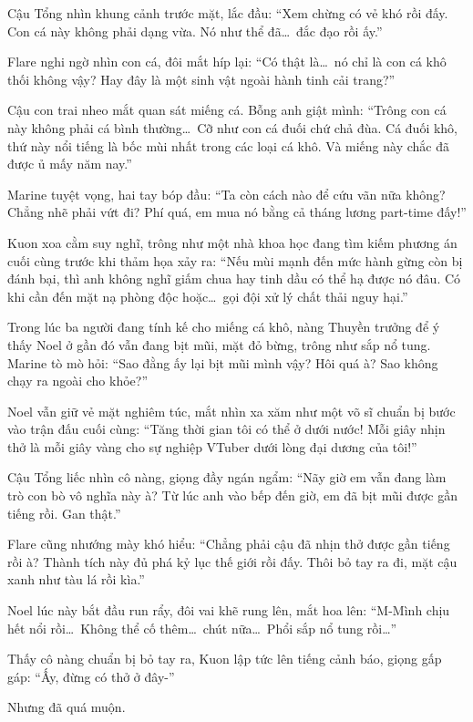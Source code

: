 \documentclass[../main.tex]{subfiles}
\begin{document}
Cậu Tổng nhìn khung cảnh trước mặt, lắc đầu: ``Xem chừng có vẻ khó rồi đấy. Con cá này không phải dạng vừa. Nó như thể đã\dots\ đắc đạo rồi ấy.''

Flare nghi ngờ nhìn con cá, đôi mắt híp lại: ``Có thật là\dots\ nó chỉ là con cá khô thối không vậy? Hay đây là một sinh vật ngoài hành tinh cải trang?''

Cậu con trai nheo mắt quan sát miếng cá. Bỗng anh giật mình: ``Trông con cá này không phải cá bình thường\dots\ Cỡ như con cá đuối chứ chả đùa. Cá đuối khô, thứ này nổi tiếng là bốc mùi nhất trong các loại cá khô. Và miếng này chắc đã được ủ mấy năm nay.''

Marine tuyệt vọng, hai tay bóp đầu: ``Ta còn cách nào để cứu vãn nữa không? Chẳng nhẽ phải vứt đi? Phí quá, em mua nó bằng cả tháng lương part-time đấy!''

Kuon xoa cằm suy nghĩ, trông như một nhà khoa học đang tìm kiếm phương án cuối cùng trước khi thảm họa xảy ra: ``Nếu mùi mạnh đến mức hành gừng còn bị đánh bại, thì anh không nghĩ giấm chua hay tinh dầu có thể hạ được nó đâu. Có khi cần đến mặt nạ phòng độc hoặc\dots\ gọi đội xử lý chất thải nguy hại.''

Trong lúc ba người đang tính kế cho miếng cá khô, nàng Thuyền trưởng để ý thấy Noel ở gần đó vẫn đang bịt mũi, mặt đỏ bừng, trông như sắp nổ tung. Marine tò mò hỏi: ``Sao đằng ấy lại bịt mũi mình vậy? Hôi quá à? Sao không chạy ra ngoài cho khỏe?''

Noel vẫn giữ vẻ mặt nghiêm túc, mắt nhìn xa xăm như một võ sĩ chuẩn bị bước vào trận đấu cuối cùng: ``Tăng thời gian tôi có thể ở dưới nước! Mỗi giây nhịn thở là mỗi giây vàng cho sự nghiệp VTuber dưới lòng đại dương của tôi!''

Cậu Tổng liếc nhìn cô nàng, giọng đầy ngán ngẩm: ``Nãy giờ em vẫn đang làm trò con bò vô nghĩa này à? Từ lúc anh vào bếp đến giờ, em đã bịt mũi được gần tiếng rồi. Gan thật.''

Flare cũng nhướng mày khó hiểu: ``Chẳng phải cậu đã nhịn thở được gần tiếng rồi à? Thành tích này đủ phá kỷ lục thế giới rồi đấy. Thôi bỏ tay ra đi, mặt cậu xanh như tàu lá rồi kìa.''

Noel lúc này bắt đầu run rẩy, đôi vai khẽ rung lên, mắt hoa lên: ``M-Mình chịu hết nổi rồi\dots\ Không thể cố thêm\dots\ chút nữa\dots\ Phổi sắp nổ tung rồi\dots''

Thấy cô nàng chuẩn bị bỏ tay ra, Kuon lập tức lên tiếng cảnh báo, giọng gấp gáp: ``Ấy, đừng có thở ở đây-''

Nhưng đã quá muộn.
\end{document}
